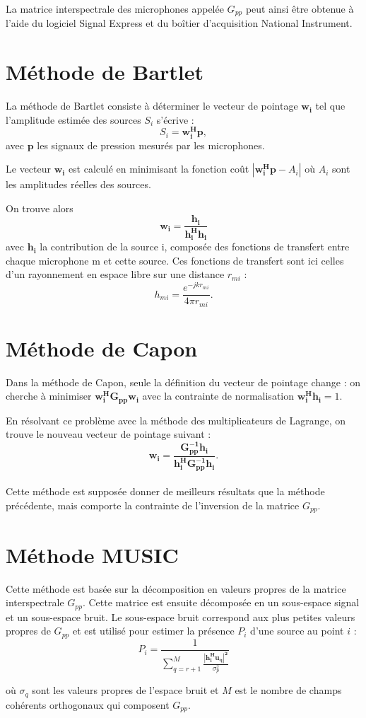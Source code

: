 \documentclass[a4paper]{article}
\renewcommand{\b}[1]{\boldsymbol{#1}}
\begin{document}
La matrice interspectrale des microphones appelée $G_{pp}$ peut ainsi être obtenue à l'aide du logiciel Signal Express et du boîtier d'acquisition National Instrument.



\section{Méthode de Bartlet}

La méthode de Bartlet consiste à déterminer le vecteur de pointage $\b{w_i}$ tel que l'amplitude estimée des sources $S_i$ s'écrive : $$S_i=\b{w_{i}^{H}p},$$ avec $\b{p}$ les signaux de pression mesurés par les microphones.

Le vecteur $\b{w_i}$ est calculé en minimisant la fonction coût $|\b{w_{i}^{H}p}-A_i|$ où $A_{i}$ sont les amplitudes réelles des sources.

On trouve alors $$\b{w_{i}}=\b{\frac{h_i}{h_{i}^{H}h_{i}}}$$ avec $\b{h_i}$ la contribution de la source i, composée des fonctions de transfert entre chaque microphone m et cette source. Ces fonctions de transfert sont ici celles d'un rayonnement en espace libre sur une distance $r_{mi}$ : $$ h_{mi}=\frac{e^{-jkr_{mi}}}{4\pi r_{mi}}.$$


\section{Méthode de Capon}

Dans la méthode de Capon, seule la définition du vecteur de pointage change : on cherche à minimiser $\b{w_{i}^{H}G_{pp}w_{i}}$ avec la contrainte de normalisation $\b{w_{i}^{H}h_i}=1$. 

En résolvant ce problème avec la méthode des multiplicateurs de Lagrange, on trouve le nouveau vecteur de pointage suivant : $$\b{w_i=\frac{G_{pp}^{-1}h_{i}}{h_{i}^{H}G_{pp}^{-1}h_{i}}}.$$\\

Cette méthode est supposée donner de meilleurs résultats que la méthode précédente, mais comporte la contrainte de l'inversion de la matrice $G_{pp}$.

\section{Méthode MUSIC}

Cette méthode est basée sur la décomposition en valeurs propres de la matrice interspectrale $G_{pp}$. Cette matrice est ensuite décomposée en un sous-espace signal et un sous-espace bruit. Le sous-espace bruit correspond aux plus petites valeurs propres de $G_{pp}$ et est utilisé pour estimer la présence $P_i$ d'une source au point $i$ :
 \begin{equation}
 P_i = \frac{1}{\sum \limits_{q=r+1}^{M} \frac{\b{\left|h_{i}^{H}u_q\right|^{2}}}{\sigma_{p}^{2}}}
\end{equation}

où $\sigma_q$ sont les valeurs propres de l'espace bruit et $M$ est le nombre de champs cohérents orthogonaux qui composent $G_{pp}$.

\newpage
\addtolength{\oddsidemargin}{-1cm}
\addtolength{\textheight}{2cm}
\renewcommand{\headsep}{-1cm}
\addtolength{\footskip}{3cm}

\end{document}
